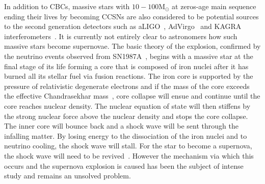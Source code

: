 \documentclass[aps,twocolumn,showpacs,groupedaddress, nofootinbib]{revtex4}  %
\begin{document}
%
%
In addition to \acp{CBC}, massive stars with $10-100 \text{M}_\odot $ at
zeros-age main sequence ending their lives by becoming 
\acp{CCSN} are also considered to be potential sources to the second generation
detectors such as \ac{aLIGO}~\cite{aasi2015advanced},
\ac{AdVirgo}~\cite{acernese2014advanced} and KAGRA
interferometers~\cite{aso2013interferometer, gossan2016observing,
abbott2016first, abbott2019optically}. It is currently not entirely clear to astronomers how such
massive stars become supernovae. The basic theory of the explosion, confirmed
by the neutrino events observed from SN1987A~\cite{sato1987analysis}, begins
with a massive star at the final stage of its life forming a core that is
composed of iron nuclei after it has burned all its stellar fuel via fusion
reactions. The iron core is supported by the pressure of relativistic
degenerate electrons and if the mass of the core exceeds the effective
Chandrasekhar mass~\cite{baron1990effect, bethe1990supernova}, core collapse
will ensue and continue until the core reaches nuclear density. The nuclear
equation of state will then stiffens by the strong nuclear force above the
nuclear density and stops the core collapse. The inner core will bounce back
and a shock wave will be sent through the infalling matter.  By losing energy
to the dissociation of the iron nuclei and to neutrino cooling, the shock wave
will stall. For the star to become a supernova, the shock wave will need to be
revived~\cite{o2011black}. However the mechanism via which this occurs and the
supernova explosion is caused has been the subject of intense study and remains
an unsolved problem.
\end{document}

